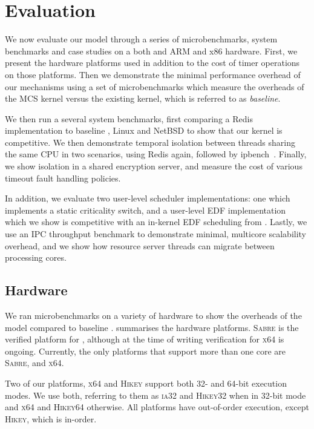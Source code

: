 \chapter{Evaluation}
\label{chap:evaluation}

We now evaluate our model through a series of microbenchmarks, system benchmarks and case studies on
a both and ARM and x86 hardware.
First, we present the hardware platforms used in addition to the cost of timer operations on those
platforms. Then we demonstrate the minimal performance overhead of our mechanisms using a set of 
microbenchmarks which measure the overheads of the MCS kernel versus the existing \selfour kernel, 
which is referred to as \emph{baseline}.  

We then run a several system benchmarks, first comparing a Redis~\citep{redis:url} 
implementation to baseline \selfour, Linux and NetBSD to show that our kernel is competitive.
We then demonstrate temporal
isolation between threads sharing the same CPU in two scenarios,
using Redis again, followed by ipbench~\citep{Wienand_Macpherson_04}. Finally, we show isolation in a
shared encryption server, and measure the cost of various timeout fault handling policies. 

In addition, we evaluate two user-level scheduler implementations: one which implements a static
criticality switch, and a user-level \gls{EDF} implementation which we show is
competitive with an in-kernel \gls{EDF} scheduling from \litmus. Lastly, we use an \gls{IPC}
throughput benchmark to demonstrate minimal, multicore scalability overhead, and we show 
how resource server threads can migrate between processing cores.

\section{Hardware}

We ran microbenchmarks on a variety of hardware to show the overheads of the model compared to
baseline \selfour.  summarises the hardware platforms. \textsc{Sabre} is
the verified platform for \selfour, although at the time of writing verification for \textsc{x64} is
ongoing. Currently, the only platforms that support more than one core are \textsc{Sabre},
and \textsc{x64}.

Two of our platforms, \textsc{x64} and \textsc{Hikey} support both 32- and 64-bit execution modes.
We use both, referring to them as \textsc{ia32} and \textsc{Hikey32} when in 32-bit mode and
\textsc{x64} and \textsc{Hikey64} otherwise. All platforms have out-of-order execution, except
\textsc{Hikey}, which is in-order.

